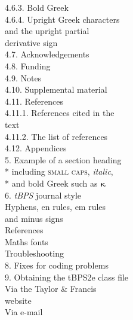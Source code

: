 \documentclass{tBPS2e}
\theoremstyle{plain}
\theoremstyle{definition}
\theoremstyle{remark}
\begin{document}
{{{\hspace*{24pt} {4.6.3.}   Bold Greek\\
\hspace*{24pt} {4.6.4.}   Upright Greek characters  \\
\hspace*{50pt}            and the upright partial \\
\hspace*{50pt}            derivative sign  \\}
\hspace{-24pt}\vbox{\noindent{}
\hspace*{7pt} {4.7.}   Acknowledgements \\
\hspace*{7pt} {4.8.}   Funding \\
\hspace*{7pt} {4.9.}   Notes \\
\hspace*{7pt} {4.10.}   Supplemental material \\
\hspace*{7pt} {4.11.}   References \\
\hspace*{24pt} {4.11.1.}  References cited in the \\
\hspace*{54pt}            text \\
\hspace*{24pt} {4.11.2.}   The list of references\\
\hspace*{7pt} {4.12.}   Appendices \\
{5.}    Example of a section heading \\*
\hspace*{7pt}   including \textsc{small caps}, \textit{italic}, \\*
\hspace*{7pt}   and bold Greek such as ${\bm\kappa}$ \\
{6.}   {\em tBPS} journal style \\
\hspace*{10pt}{6.1.}   Hyphens, en rules, em rules \\ \hspace*{27pt}and minus signs\\
\hspace*{10pt}{6.2.}   References \\
\hspace*{10pt}{6.3.}   Maths fonts\\
   Troubleshooting\\
{8.}   Fixes for coding problems\\
{9.}   Obtaining the tBPS2e class file\\
\hspace*{10pt}{9.1}  Via the Taylor \& Francis \\
\hspace*{24pt}       website \\
\hspace*{10pt}{9.2}  Via e-mail\\ }}}
\end{document}
